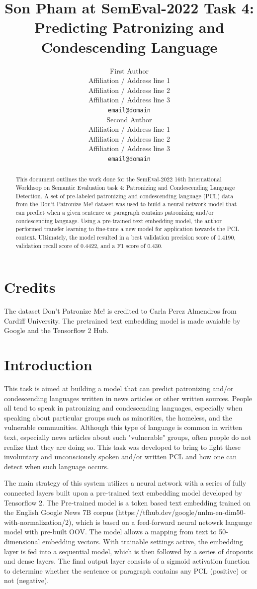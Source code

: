 \documentclass[11pt,a4paper]{article}
\title{Son Pham at SemEval-2022 Task 4: Predicting Patronizing and Condescending Language}
\author{First Author \\
  Affiliation / Address line 1 \\
  Affiliation / Address line 2 \\
  Affiliation / Address line 3 \\
  \texttt{email@domain} \\\And
  Second Author \\
  Affiliation / Address line 1 \\
  Affiliation / Address line 2 \\
  Affiliation / Address line 3 \\
  \texttt{email@domain} \\}
\date{}
\begin{document}
\maketitle
\begin{abstract}
This document outlines the work done for the SemEval-2022 16th International Workhsop on Semantic Evaluation task 4: Patronizing and Condescending Language Detection. A set of pre-labeled patronizing and condescending language (PCL) data from the Don't Patronize Me! dataset was used to build a neural network model that can predict when a given sentence or paragraph contains patronizing and/or condescending language. Using a pre-trained text embedding model, the author performed transfer learning to fine-tune a new model for application towards the PCL context. Ultimately, the model resulted in a best validation precision score of 0.4190, validation recall score of 0.4422, and a F1 score of 0.430.

\end{abstract}

\section{Credits}

The dataset Don't Patronize Me! is credited to Carla Perez Almendros from Cardiff University. The pretrained text embedding model is made avaiable by Google and the Tensorflow 2 Hub.

\section{Introduction}

This task is aimed at building a model that can predict patronizing and/or condescending languages written in news articles or other written sources. People all tend to speak in patronizing and condescending languages, especially when speaking about particular groups such as minorities, the homeless, and the vulnerable communities. Although this type of language is common in written text, especially news articles about such "vulnerable" groups, often people do not realize that they are doing so. This task was developed to bring to light these involuntary and unconsciously spoken and/or written PCL and how one can detect when such language occurs. \cite{perez-almendros-etal-2020-dont}

The main strategy of this system utilizes a neural network with a series of fully connected layers built upon a pre-trained text embedding model developed by Tensorflow 2. The Pre-trained model is a token based text embedding trained on the English Google News 7B corpus (https://tfhub.dev/google/nnlm-en-dim50-with-normalization/2), which is based on a feed-forward neural netowrk language model with pre-built OOV. The model allows a mapping from text to 50-dimensional embedding vectors. With trainable settings active, the embedding layer is fed into a sequential model, which is then followed by a series of dropouts and dense layers. The final output layer consists of a sigmoid activation function to determine whether the sentence or paragraph contains any PCL (positive) or not (negative). 
\end{document}
